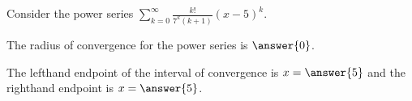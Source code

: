 \documentclass{ximera}
\author{Jim Talamo}
\begin{document}
\begin{exercise}
Consider the power series $\sum_{k=0}^{\infty} \frac{k!}{7^k (k+1)}(x-5)^k$.

The radius of convergence for the power series is $\answer{0}$.

The lefthand endpoint of the interval of convergence is $x=\answer{5}$ and the righthand endpoint is $x= \answer{5}$.


\end{exercise}
\end{document}
